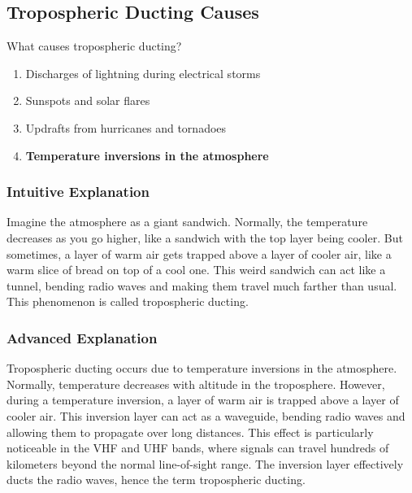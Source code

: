 \subsection{Tropospheric Ducting Causes}
\label{T3C08}

\begin{tcolorbox}[colback=gray!10!white,colframe=black!75!black,title=T3C08]
What causes tropospheric ducting?
\begin{enumerate}[noitemsep]
    \item Discharges of lightning during electrical storms
    \item Sunspots and solar flares
    \item Updrafts from hurricanes and tornadoes
    \item \textbf{Temperature inversions in the atmosphere}
\end{enumerate}
\end{tcolorbox}

\subsubsection*{Intuitive Explanation}
Imagine the atmosphere as a giant sandwich. Normally, the temperature decreases as you go higher, like a sandwich with the top layer being cooler. But sometimes, a layer of warm air gets trapped above a layer of cooler air, like a warm slice of bread on top of a cool one. This weird sandwich can act like a tunnel, bending radio waves and making them travel much farther than usual. This phenomenon is called tropospheric ducting.

\subsubsection*{Advanced Explanation}
Tropospheric ducting occurs due to temperature inversions in the atmosphere. Normally, temperature decreases with altitude in the troposphere. However, during a temperature inversion, a layer of warm air is trapped above a layer of cooler air. This inversion layer can act as a waveguide, bending radio waves and allowing them to propagate over long distances. This effect is particularly noticeable in the VHF and UHF bands, where signals can travel hundreds of kilometers beyond the normal line-of-sight range. The inversion layer effectively ducts the radio waves, hence the term tropospheric ducting.